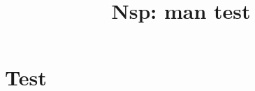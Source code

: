 \documentclass[11pt]{book}
\title{Nsp: man test } %
\begin{document}
\maketitle


\chapter{Test}

 \manname
\end{document}
